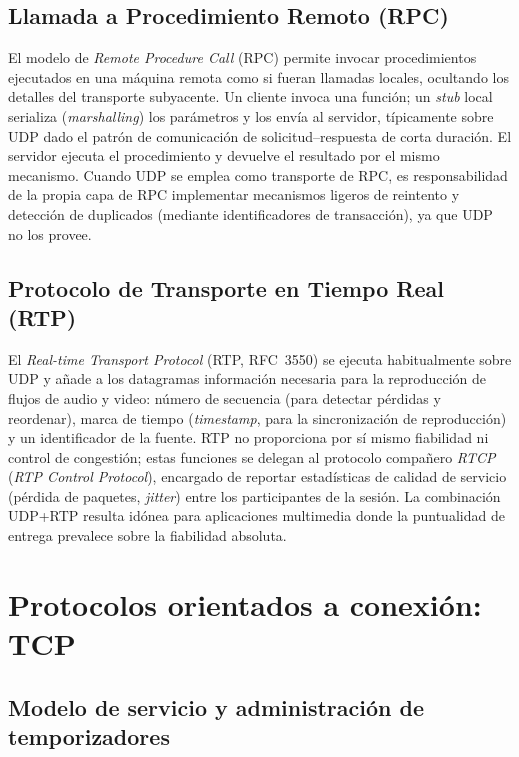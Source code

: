 \documentclass[conference]{IEEEtran}
\begin{document}
\subsection{Llamada a Procedimiento Remoto (RPC)}

El modelo de \emph{Remote Procedure Call} (RPC) permite invocar procedimientos ejecutados en una máquina remota como si fueran llamadas locales, ocultando los detalles del transporte subyacente. Un cliente invoca una función; un \textit{stub} local serializa (\textit{marshalling}) los parámetros y los envía al servidor, típicamente sobre UDP dado el patrón de comunicación de solicitud--respuesta de corta duración. El servidor ejecuta el procedimiento y devuelve el resultado por el mismo mecanismo. Cuando UDP se emplea como transporte de RPC, es responsabilidad de la propia capa de RPC implementar mecanismos ligeros de reintento y detección de duplicados (mediante identificadores de transacción), ya que UDP no los provee.

\subsection{Protocolo de Transporte en Tiempo Real (RTP)}

El \emph{Real-time Transport Protocol} (RTP, RFC~3550) se ejecuta habitualmente sobre UDP y añade a los datagramas información necesaria para la reproducción de flujos de audio y video: número de secuencia (para detectar pérdidas y reordenar), marca de tiempo (\textit{timestamp}, para la sincronización de reproducción) y un identificador de la fuente. RTP no proporciona por sí mismo fiabilidad ni control de congestión; estas funciones se delegan al protocolo compañero \emph{RTCP} (\textit{RTP Control Protocol}), encargado de reportar estadísticas de calidad de servicio (pérdida de paquetes, \textit{jitter}) entre los participantes de la sesión. La combinación UDP+RTP resulta idónea para aplicaciones multimedia donde la puntualidad de entrega prevalece sobre la fiabilidad absoluta.

\section{Protocolos orientados a conexión: TCP}

\subsection{Modelo de servicio y administración de temporizadores}
\end{document}
